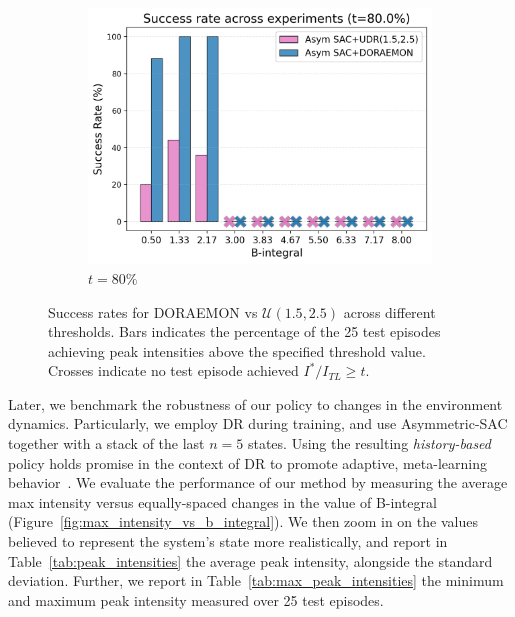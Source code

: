 \begin{figure}
\begin{subfigure}{0.32\textwidth}
        \centering
        \includegraphics[width=\linewidth]{images/doraemon_vs_udr_succ_rate_80.png}
        \caption{\( t = 80 \% \)}
        \label{fig:succ_rate_80}
    \end{subfigure}
    \caption{Success rates for DORAEMON vs \( \mathcal U(1.5, 2.5) \) across different thresholds. Bars indicates the percentage of the 25 test episodes achieving peak intensities above the specified threshold value. Crosses indicate no test episode achieved \(I^*/I_{TL} \geq t \).}
    \label{fig:succ_rate}
\end{figure}

Later, we benchmark the robustness of our policy to changes in the environment dynamics.
Particularly, we employ DR during training, and use Asymmetric-SAC together with a stack of the last \( n=5 \) states. Using the resulting \emph{history-based} policy holds promise in the context of DR to promote adaptive, meta-learning behavior~\citep{chen2021understanding, tiboni2023domain, akkaya2019solving}.
We evaluate the performance of our method by measuring the average max intensity versus equally-spaced changes in the value of B-integral (Figure~\ref{fig:max_intensity_vs_b_integral}). We then zoom in on the values believed to represent the system's state more realistically, and report in Table~\ref{tab:peak_intensities} the average peak intensity, alongside the standard deviation. Further, we report in Table~\ref{tab:max_peak_intensities} the minimum and maximum peak intensity measured over 25 test episodes.

